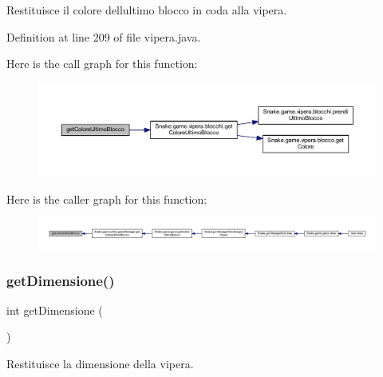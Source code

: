 Restituisce il colore dell\textquotesingle{}ultimo blocco in coda alla vipera. 



Definition at line 209 of file vipera.\+java.

Here is the call graph for this function\+:
\nopagebreak
\begin{figure}[H]
\begin{center}
\leavevmode
\includegraphics[width=350pt]{class_snake_1_1game_1_1vipera_1_1vipera_a1afbc9b85396f53e6180eab2e5a36d4d_cgraph}
\end{center}
\end{figure}
Here is the caller graph for this function\+:
\nopagebreak
\begin{figure}[H]
\begin{center}
\leavevmode
\includegraphics[width=350pt]{class_snake_1_1game_1_1vipera_1_1vipera_a1afbc9b85396f53e6180eab2e5a36d4d_icgraph}
\end{center}
\end{figure}
\mbox{\label{class_snake_1_1game_1_1vipera_1_1vipera_acda812adf1e0abdaf30cf3a2e2efaa07}} 
\subsubsection{\texorpdfstring{get\+Dimensione()}{getDimensione()}}
{\footnotesize\ttfamily int get\+Dimensione (\begin{DoxyParamCaption}{ }\end{DoxyParamCaption})}



Restituisce la dimensione della vipera. 



